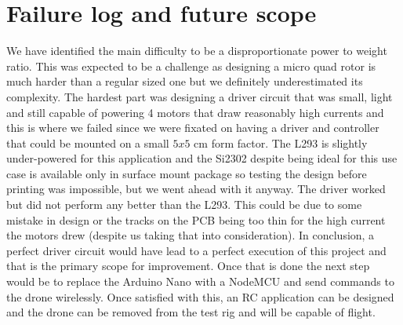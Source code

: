 \documentclass[9pt]{article}
\begin{document}
\section{Failure log and future scope}
We have identified the main difficulty to be a disproportionate power to weight ratio. This was expected to be a challenge as designing a micro quad rotor is much harder than a regular sized one but we definitely underestimated its complexity. The hardest part was designing a driver circuit that was small, light and still capable of powering 4 motors that draw reasonably high currents and this is where we failed since we were fixated on having a driver and controller that could be mounted on a small $5x5$ cm form factor. The L293 is slightly under-powered for this application and the Si2302 despite being ideal for this use case is available only in surface mount package so testing the design before printing was impossible, but we went ahead with it anyway. The driver worked but did not perform any better than the L293. This could be due to some mistake in design or the tracks on the PCB being too thin for the high current the motors drew (despite us taking that into consideration). In conclusion, a perfect driver circuit would have lead to a perfect execution of this project and that is the primary scope for improvement. Once that is done the next step would be to replace the Arduino Nano with a NodeMCU and send commands to the drone wirelessly. Once satisfied with this, an RC application can be designed and the drone can be removed from the test rig and will be capable of flight.



\end{document}
